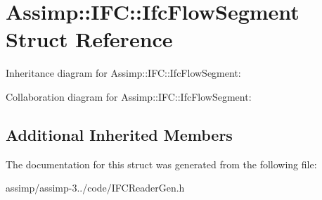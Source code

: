 \hypertarget{struct_assimp_1_1_i_f_c_1_1_ifc_flow_segment}{\section{Assimp\+:\+:I\+F\+C\+:\+:Ifc\+Flow\+Segment Struct Reference}
\label{struct_assimp_1_1_i_f_c_1_1_ifc_flow_segment}
}


Inheritance diagram for Assimp\+:\+:I\+F\+C\+:\+:Ifc\+Flow\+Segment\+:


Collaboration diagram for Assimp\+:\+:I\+F\+C\+:\+:Ifc\+Flow\+Segment\+:
\subsection*{Additional Inherited Members}


The documentation for this struct was generated from the following file\+:\begin{DoxyCompactItemize}
\item 
assimp/assimp-\/3../code/I\+F\+C\+Reader\+Gen.\+h\end{DoxyCompactItemize}
